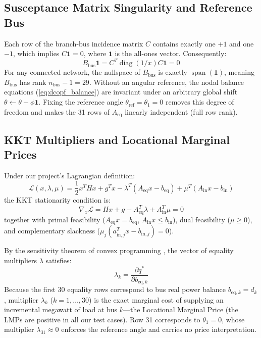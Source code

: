 \subsection{Susceptance Matrix Singularity and Reference Bus}
Each row of the branch-bus incidence matrix $C$ contains exactly one $+1$ and one $-1$, which implies $C \mathbf{1} = 0$, where $\mathbf{1}$ is the all-ones vector. Consequently:
\begin{equation}
    B_{\text{bus}} \mathbf{1} = C^T \operatorname{diag}(1/x) C \mathbf{1} = 0
\end{equation}
For any connected network, the nullspace of $B_{\text{bus}}$ is exactly $\operatorname{span}(\mathbf{1})$, meaning $B_{\text{bus}}$ has rank $n_{\text{bus}} - 1 = 29$. Without an angular reference, the nodal balance equations (\ref{eq:dcopf_balance}) are invariant under an arbitrary global shift $\theta \leftarrow \theta + \phi \mathbf{1}$. Fixing the reference angle $\theta_{\text{ref}} = \theta_1 = 0$ removes this degree of freedom and makes the 31 rows of $A_{\text{eq}}$ linearly independent (full row rank).

\subsection{KKT Multipliers and Locational Marginal Prices}
Under our project's Lagrangian definition:
\begin{equation}
    \mathcal{L}(x, \lambda, \mu) = \frac{1}{2} x^T H x + g^T x - \lambda^T (A_{\text{eq}} x - b_{\text{eq}}) + \mu^T (A_{\text{in}} x - b_{\text{in}})
\end{equation}
the KKT stationarity condition is:
\begin{equation}
    \nabla_x \mathcal{L} = H x + g - A_{\text{eq}}^T \lambda + A_{\text{in}}^T \mu = 0
\end{equation}
together with primal feasibility ($A_{\text{eq}} x = b_{\text{eq}}$, $A_{\text{in}} x \le b_{\text{in}}$), dual feasibility ($\mu \ge 0$), and complementary slackness ($\mu_j (a_{\text{in}, j}^T x - b_{\text{in}, j}) = 0$).

By the sensitivity theorem of convex programming \cite{boyd2004}, the vector of equality multipliers $\lambda$ satisfies:
\begin{equation}
    \lambda_k = \frac{\partial q^*}{\partial b_{\text{eq}, k}}
\end{equation}
Because the first 30 equality rows correspond to bus real power balance $b_{\text{eq}, k} = d_k$, multiplier $\lambda_k$ ($k=1,\dots,30$) is the exact marginal cost of supplying an incremental megawatt of load at bus $k$---the Locational Marginal Price (the LMPs are positive in all our test cases). Row 31 corresponds to $\theta_1 = 0$, whose multiplier $\lambda_{31} \approx 0$ enforces the reference angle and carries no price interpretation.

